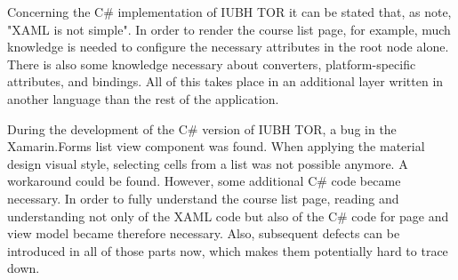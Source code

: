 Concerning the C\# implementation of IUBH TOR it can be stated that, as \cite{syme_making_2018} note, "XAML is not simple". In order to render the course list page, for example, much knowledge is needed to configure the necessary attributes in the root node alone. There is also some knowledge necessary about converters, platform-specific attributes, and bindings. All of this takes place in an additional layer written in another language than the rest of the application. 

During the development of the C\# version of IUBH TOR, a bug in the Xamarin.Forms list view component was found. When applying the material design visual style, selecting cells from a list was not possible anymore. A workaround could be found. However, some additional C\# code became necessary. In order to fully understand the course list page, reading and understanding not only of the XAML code but also of the C\# code for page and view model became therefore necessary. Also, subsequent defects can be introduced in all of those parts now, which makes them potentially hard to trace down.
